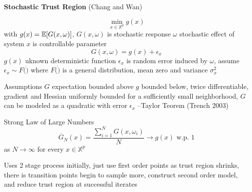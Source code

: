 \textbf{Stochastic Trust Region}	(Chang and Wan) \cite{chang_2009}

\begin{equation}
\min_{x \in \mathbb{X}^p} g(x)
\end{equation}
with $g(x) = \mathbb{E} [ G(x,\omega) ]$, 
$G(x, \omega)$ is stochastic response
$\omega$ stochastic effect of system
$x$ is controllable parameter
\begin{equation}
G(x, \omega) = g(x) + \epsilon_x
\end{equation}
$g(x)$ uknown deterministic function
$\epsilon_x$ is random error induced by $\omega$, assume $\epsilon_x \sim F( \dot )$ where 
$F( \dot )$ is a general distribution, mean zero and variance $\sigma_x^2$

Assumptions
$G$ expectation bounded above
$g$ bounded below, twice differentiable, gradient and Hessian uniformly bounded
for a sufficiently small neighborhood, $G$ can be modeled as a quadratic with error $\epsilon_x$ 
--Taylor Teorem (Trench 2003)

Strong Law of Large Numbers
\begin{equation}
\overline{G}_N (x) = \frac{ \sum_{i=1}^N G(x,\omega_i) }{N} \rightarrow g(x) \mbox{    w.p. 1}
\end{equation}
as $N \rightarrow \infty$ for every $x \in \mathbb{X}^p$

Uses 2 stage process
initially, just use first order points
as trust region shrinks, there is transition points
begin to sample more, construct second order model, and reduce trust region at successful iterates
